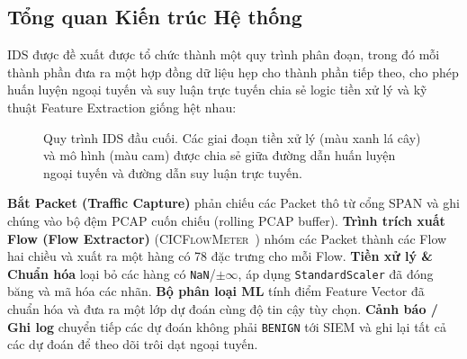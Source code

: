 \subsection{Tổng quan Kiến trúc Hệ thống}
\label{sec:arch-overview}

IDS được đề xuất được tổ chức thành một quy trình phân đoạn, trong đó mỗi thành phần đưa ra một hợp đồng dữ liệu hẹp cho thành phần tiếp theo, cho phép huấn luyện ngoại tuyến và suy luận trực tuyến chia sẻ logic tiền xử lý và kỹ thuật Feature Extraction giống hệt nhau:

\begin{figure}[h]
\centering
{}
\caption{Quy trình IDS đầu cuối. Các giai đoạn tiền xử lý (màu xanh lá cây) và mô hình (màu cam) được chia sẻ giữa đường dẫn huấn luyện ngoại tuyến và đường dẫn suy luận trực tuyến.}
\label{fig:pipeline}
\end{figure}

\textbf{Bắt Packet (Traffic Capture)} phản chiếu các Packet thô từ cổng SPAN và ghi chúng vào bộ đệm PCAP cuốn chiếu (rolling PCAP buffer).
\textbf{Trình trích xuất Flow (Flow Extractor)} (\textsc{CICFlowMeter}~\cite{ref_cicflowmeter}) nhóm các Packet thành các Flow hai chiều và xuất ra một hàng có 78 đặc trưng cho mỗi Flow.
\textbf{Tiền xử lý \& Chuẩn hóa} loại bỏ các hàng có \texttt{NaN}/$\pm\infty$, áp dụng \texttt{StandardScaler} đã đóng băng và mã hóa các nhãn.
\textbf{Bộ phân loại ML} tính điểm Feature Vector đã chuẩn hóa và đưa ra một lớp dự đoán cùng độ tin cậy tùy chọn.
\textbf{Cảnh báo / Ghi log} chuyển tiếp các dự đoán không phải \texttt{BENIGN} tới SIEM và ghi lại tất cả các dự đoán để theo dõi trôi dạt ngoại tuyến.
